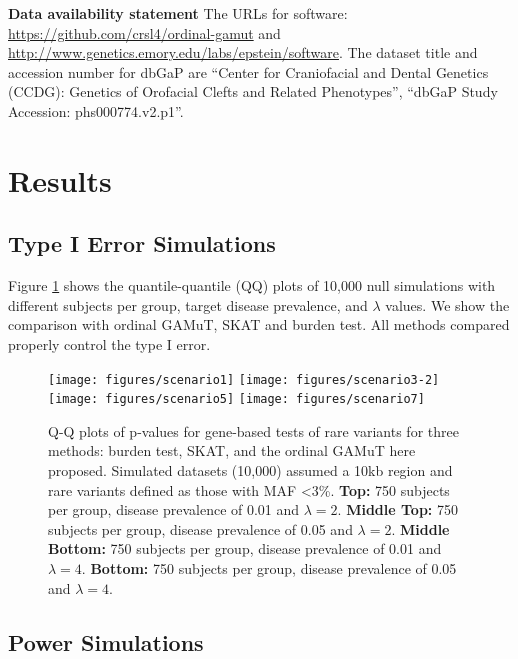 \documentclass[]{article}
\theoremstyle{definition}
\theoremstyle{definition}
\theoremstyle{definition}
\theoremstyle{remark}
\begin{document}
\textbf{Data availability statement } The URLs for software:
\url{https://github.com/crsl4/ordinal-gamut} and
\url{http://www.genetics.emory.edu/labs/epstein/software}. The dataset
title and accession number for dbGaP are ``Center for Craniofacial and
Dental Genetics (CCDG): Genetics of Orofacial Clefts and Related
Phenotypes'', ``dbGaP Study Accession: phs000774.v2.p1''.

\hypertarget{results}{%
\section{Results}\label{results}}

\hypertarget{type-i-error-simulations}{%
\subsection{Type I Error Simulations}\label{type-i-error-simulations}}

Figure \ref{fig:qq} shows the quantile-quantile (QQ) plots of 10,000
null simulations with different subjects per group, target disease
prevalence, and \(\lambda\) values. We show the comparison with ordinal
GAMuT, SKAT and burden test. All methods compared properly control the
type I error.

\begin{figure}

{\centering \texttt{[image: figures/scenario1]} \texttt{[image: figures/scenario3-2]} \texttt{[image: figures/scenario5]} \texttt{[image: figures/scenario7]} 

}

\caption{Q-Q plots of p-values for gene-based tests of rare variants for three methods: burden test, SKAT, and the ordinal GAMuT here proposed. Simulated datasets (10,000) assumed a 10kb region and rare variants defined as those with MAF <3\%. \textbf{Top:} 750 subjects per group,  disease prevalence of 0.01 and $\lambda=2$. \textbf{Middle Top:} 750 subjects per group, disease prevalence of 0.05 and $\lambda=2$. \textbf{Middle Bottom:} 750 subjects per group, disease prevalence of 0.01 and $\lambda=4$. \textbf{Bottom:} 750 subjects per group, disease prevalence of 0.05 and $\lambda=4$.}\label{fig:qq}
\end{figure}

\hypertarget{power-simulations}{%
\subsection{Power Simulations}\label{power-simulations}}
\end{document}
